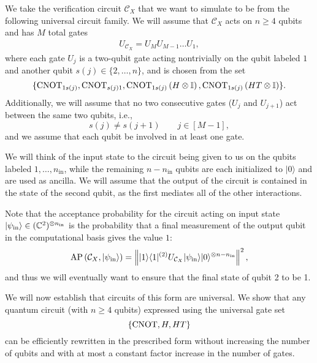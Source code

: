 \documentclass[../thesis-main/thesis-main]{subfiles}
\begin{document}
We take the verification circuit $\mathcal{C}_{X}$ that we want to simulate to be from the following universal circuit family.  We will assume that $\mathcal{C}_X$ acts on $n\geq 4$ qubits and has $M$ total gates
\begin{align}
  U_{\mathcal{C}_{X}}=U_{M}U_{M-1}\ldots U_{1},
\end{align}
where each gate $U_j$ is a two-qubit gate acting nontrivially on the qubit labeled $1$ and another qubit $s(j)\in\{2,\ldots,n\}$, and is chosen from the set
\begin{equation}
  \{\mathrm{CNOT}_{1s(j)},\mathrm{CNOT}_{s(j)1},\mathrm{CNOT}_{1s(j)}\left(H\otimes\mathbb{I}\right),\mathrm{CNOT}_{1s(j)}\left(HT\otimes\mathbb{I}\right)\}.\label{eq:gate_set_Vr}
\end{equation}
Additionally, we will assume that no two consecutive gates ($U_j$ and $U_{j+1}$) act between the same two qubits, i.e., 
\begin{equation}
s(j)\neq s(j+1)\qquad j\in[M-1],\label{eq:condition_ij}
\end{equation}
and we assume that each qubit be involved in at least one gate.

We will think of the input state to the circuit being given to us on the qubits labeled $1,\ldots,n_{\text{in}}$, while the remaining $n-n_{\text{in}}$ qubits are each initialized to $|0\rangle$ and are used as ancilla.  We will assume that the output of the circuit is contained in the state of the second qubit, as the first mediates all of the other interactions.

Note that the acceptance probability for the circuit acting on input state $|\psi_{{\text{in}}}\rangle\in(\mathbb{C}^{2})^{\otimes n_{{\text{in}}}}$ is the probability that a final measurement of the output qubit in the computational basis gives the value $1$: 
\begin{align}
\operatorname{AP}\left(\mathcal{C}_{X},|\psi_{{\text{in}}}\rangle\right)=\left\Vert |1\rangle\langle1|^{(2)}U_{\mathcal{C}_{X}}|\psi_{{\text{in}}}\rangle|0\rangle^{\otimes n-n_{{\text{in}}}}\right\Vert ^{2},
\end{align}
and thus we will eventually want to ensure that the final state of qubit 2 to be 1.

We will now establish that circuits of this form are universal. We show that any quantum circuit (with $n\geq 4$ qubits) expressed using the universal gate set
\begin{equation}
\{\mathrm{CNOT},H,HT\}\label{eq:standard_gate_ste}
\end{equation}
can be efficiently rewritten in the prescribed form without increasing the number of qubits and with at most a constant factor increase in the number of gates.
\end{document}
